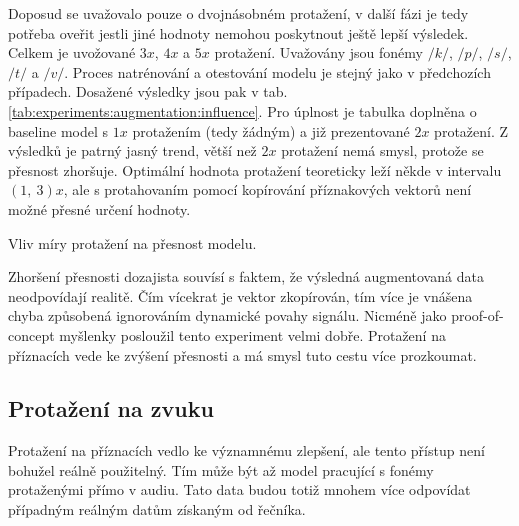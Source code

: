 Doposud se uvažovalo pouze o dvojnásobném protažení, v další fázi je tedy potřeba oveřit jestli jiné hodnoty nemohou poskytnout ještě lepší výsledek. Celkem je uvožované $3x$, $4x$ a $5x$ protažení. Uvažovány jsou fonémy $/k/$, $/p/$, $/s/$, $/t/$ a $/v/$. Proces natrénování a otestování modelu je stejný jako v předchozích případech. Dosažené výsledky jsou pak v tab. \ref{tab:experiments:augmentation:influence}. Pro úplnost je tabulka doplněna o baseline model s $1x$ protažením (tedy žádným) a již prezentované $2x$ protažení. Z výsledků je patrný jasný trend, větší než $2x$ protažení nemá smysl, protože se přesnost zhoršuje. Optimální hodnota protažení teoreticky leží někde v intervalu $\left(1,\ 3\right)x$, ale s protahovaním pomocí kopírování příznakových vektorů není možné přesné určení hodnoty.

\begin{table}[htpb]
  \centering
  \def\arraystretch{1.5}
  \caption{Vliv míry protažení na přesnost modelu.}
  \label{tab:experiments:augmentation:influence}
\end{table}

Zhoršení přesnosti dozajista souvísí s faktem, že výsledná augmentovaná data neodpovídají realitě. Čím vícekrat je vektor zkopírován, tím více je vnášena chyba způsobená ignorováním dynamické povahy signálu. Nicméně jako proof-of-concept myšlenky posloužil tento experiment velmi dobře. Protažení na příznacích vede ke zvýšení přesnosti a má smysl tuto cestu více prozkoumat.

\subsection{Protažení na zvuku}
\label{chap:realisation:augmentation:audio}

Protažení na příznacích vedlo ke významnému zlepšení, ale tento přístup není bohužel reálně použitelný. Tím může být až model pracující s fonémy protaženými přímo v audiu. Tato data budou totiž mnohem více odpovídat případným reálným datům získaným od řečníka.

